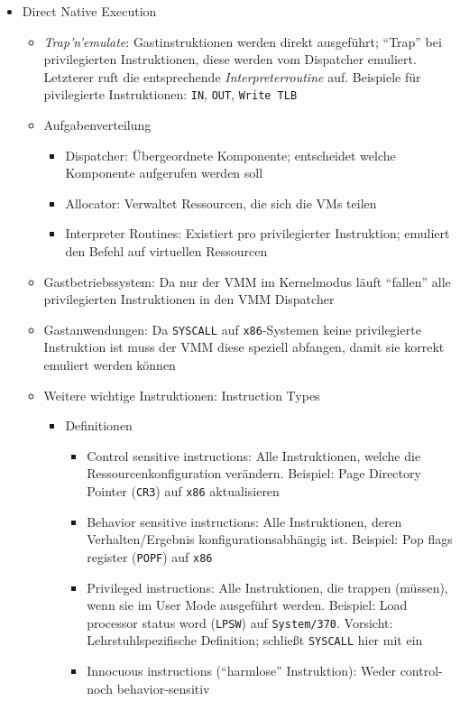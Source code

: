 \begin{itemize}
\begin{itemize}
\begin{itemize}
		\end{itemize}
		\item Direct Native Execution
		\begin{itemize}
			\item \textit{Trap'n'emulate}: Gastinstruktionen werden direkt ausgeführt; "`Trap"' bei privilegierten Instruktionen, diese werden vom Dispatcher emuliert. Letzterer ruft die entsprechende \textit{Interpreterroutine} auf. Beispiele für pivilegierte Instruktionen: \texttt{IN}, \texttt{OUT}, \texttt{Write TLB}
			\item Aufgabenverteilung
			\begin{itemize}
				\item Dispatcher: Übergeordnete Komponente; entscheidet welche Komponente aufgerufen werden soll
				\item Allocator: Verwaltet Ressourcen, die sich die VMs teilen
				\item Interpreter Routines: Existiert pro privilegierter Instruktion; emuliert den Befehl auf virtuellen Ressourcen %
			\end{itemize}
			\item Gastbetriebssystem: Da nur der VMM im Kernelmodus läuft "`fallen"' alle privilegierten Instruktionen in den VMM Dispatcher
			\item Gastanwendungen: Da \texttt{SYSCALL} auf \texttt{x86}-Systemen keine privilegierte Instruktion ist muss der VMM diese speziell abfangen, damit sie korrekt emuliert werden können
			\item Weitere wichtige Instruktionen: Instruction Types
			\begin{itemize}
				\item Definitionen
				\begin{itemize}
					\item Control sensitive instructions: Alle Instruktionen, welche die Ressourcenkonfiguration verändern. Beispiel: Page Directory Pointer (\texttt{CR3}) auf \texttt{x86} aktualisieren
					\item Behavior sensitive instructions: Alle Instruktionen, deren Verhalten/Ergebnis konfigurationsabhängig ist. Beispiel: Pop flags register (\texttt{POPF}) auf \texttt{x86}
					\item Privileged instructions: Alle Instruktionen, die trappen (müssen), wenn sie im User Mode ausgeführt werden. Beispiel: Load processor status word (\texttt{LPSW}) auf \texttt{System/370}. Vorsicht: Lehrstuhlspezifische Definition; schließt \texttt{SYSCALL} hier mit ein
					\item Innocuous instructions ("`harmlose"' Instruktion): Weder control- noch behavior-sensitiv

\end{itemize}
\end{itemize}
\end{itemize}
\end{itemize}
\end{itemize}
